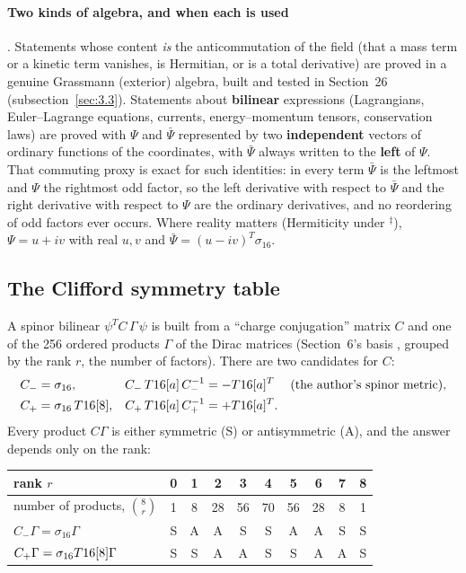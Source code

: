 \paragraph{Two kinds of algebra, and when each is used} . Statements whose content
\emph{is} the anticommutation of the field (that a mass term or a kinetic term vanishes, is
Hermitian, or is a total derivative) are proved in a genuine Grassmann (exterior) algebra, built and
tested in Section~26 (subsection~\ref{sec:3.3}). Statements about \textbf{bilinear} expressions
(Lagrangians, Euler--Lagrange equations, currents, energy--momentum tensors, conservation laws) are
proved with $\Psi$ and $\bar\Psi$ represented by two \textbf{independent} vectors of ordinary
functions of the coordinates, with $\bar\Psi$ always written to the \textbf{left} of $\Psi$. That
commuting proxy is exact for such identities: in every term $\bar\Psi$ is the leftmost and $\Psi$
the rightmost odd factor, so the left derivative with respect to $\bar\Psi$ and the right
derivative with respect to $\Psi$ are the ordinary derivatives, and no reordering of odd factors
ever occurs. Where reality matters (Hermiticity under ${}^{\ddagger}$), $\Psi=u+iv$ with real $u,v$
and $\bar\Psi=(u-iv)^{T}\sigma_{16}$.

\subsection{The Clifford symmetry table}
\label{sec:3.1}

A spinor bilinear $\psi^{T}C\,\Gamma\,\psi$ is built from a ``charge conjugation'' matrix $C$ and
one of the 256 ordered products $\Gamma$ of the Dirac matrices (Section~6's basis ,
grouped by the rank $r$, the number of factors). There are two candidates for $C$:
\begin{align*}
  C_- &= \sigma_{16}, & C_-\,T16[a]\,C_-^{-1} &= -T16[a]^{T} &&\text{(the author's spinor metric)},\\
  C_+ &= \sigma_{16}\,T16[8], & C_+\,T16[a]\,C_+^{-1} &= +T16[a]^{T} .
\end{align*}
Every product $C\Gamma$ is either symmetric (S) or antisymmetric (A), and the answer depends only
on the rank:

\begin{center}
\begin{tabular}{@{}lccccccccc@{}}
\toprule
rank $r$ & 0 & 1 & 2 & 3 & 4 & 5 & 6 & 7 & 8 \\
\midrule
number of products, $\binom{8}{r}$ & 1 & 8 & 28 & 56 & 70 & 56 & 28 & 8 & 1 \\
$C_-\Gamma=\sigma_{16}\Gamma$ & S & A & A & S & S & A & A & S & S \\
$C_+\Gamma=\sigma_{16}T16[8]\Gamma$ & S & S & A & A & S & S & A & A & S \\
\bottomrule
\end{tabular}
\end{center}

